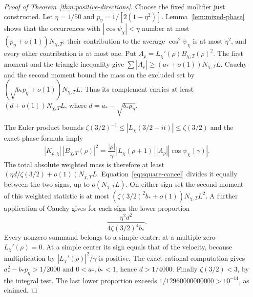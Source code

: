 \begin{proof}[Proof of Theorem~\ref{thm:positive-directions}]
Choose the fixed mollifier just constructed. Let $\eta=1/50$ and
$p_\eta=1/[2(1-\eta^2)]$. Lemma~\ref{lem:mixed-phase} shows that
the occurrences with $|\cos\psi_\chi|<\eta$ number at most
$(p_\eta+o(1))N_{\chi,T}$: their contribution to the average
$\cos^2\psi_\chi$ is at most $\eta^2$, and every other contribution
is at most one. Put $A_\rho=L_\chi'(\rho)B_{\chi,T}(\rho)^2$.
The first moment and the triangle inequality give
$\sum|A_\rho|\ge(a_*+o(1))N_{\chi,T}L$.
Cauchy and the second moment bound the mass on the excluded set by
$(\sqrt{b_*p_\eta}+o(1))N_{\chi,T}L$. Thus its complement carries
at least $(d+o(1))N_{\chi,T}L$, where
$d=a_*-\sqrt{b_*p_\eta}$.

The Euler product bounds
$\zeta(3/2)^{-1}\le|L_\chi(3/2+it)|\le\zeta(3/2)$ and the exact
phase formula imply
\[
 |K_{\rho,\chi}|\,|B_{\chi,T}(\rho)|^2
  =\frac{|\rho|}{\gamma}|L_\chi(\rho+1)|\,|A_\rho|
                  |\cos\psi_\chi(\gamma)|.
\]
The total absolute weighted mass is therefore at least
$(\eta d/\zeta(3/2)+o(1))N_{\chi,T}L$.
Equation~\eqref{eq:square-cancel} divides it equally between the
two signs, up to $o(N_{\chi,T}L)$. On either sign set the second
moment of this weighted statistic is at most
$(\zeta(3/2)^2b_*+o(1))N_{\chi,T}L^2$. A further application of
Cauchy gives for each sign the lower proportion
\[
 \frac{\eta^2d^2}{4\zeta(3/2)^4b_*}.
\]
Every nonzero summand belongs to a simple center: at a multiple zero
$L_\chi'(\rho)=0$. At a simple center its sign equals that of the
velocity, because multiplication by $|L_\chi'(\rho)|^2/\gamma$ is
positive. The exact rational computation gives
$a_*^2-b_*p_\eta>1/2000$ and $0<a_*,b_*<1$, hence $d>1/4000$.
Finally $\zeta(3/2)<3$, by the integral test. The last lower
proportion exceeds
$1/12960000000000>10^{-14}$, as claimed.
\end{proof}
